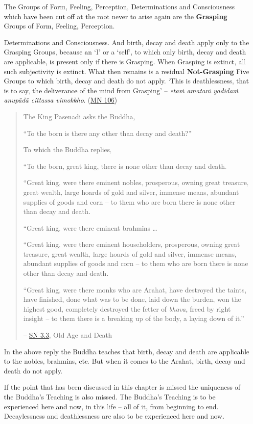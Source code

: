 The Groups of Form, Feeling, Perception, Determinations and Consciousness which have been cut off at the root never to arise again are the \textbf{Grasping} Groups of Form, Feeling, Perception.

Determinations and Consciousness. And birth, decay and death apply only to the Grasping Groups, because an `I' or a `self', to which only birth, decay and death are applicable, is present only if there is Grasping. When Grasping is extinct, all such subjectivity is extinct. What then remains is a residual \textbf{Not-Grasping} Five Groups to which birth, decay and death do not apply. `This is deathlessness, that is to say, the deliverance of the mind from Grasping' -- \emph{etaṁ amataṁ yadidaṁ anupādā cittassa vimokkho}. (\href{https://suttacentral.net/mn106/en/sujato}{MN 106})

\begin{quote}
The King Pasenadi asks the Buddha,

``To the born is there any other than decay and death?''

To which the Buddha replies,

``To the born, great king, there is none other than decay and death.

``Great king, were there eminent nobles, prosperous, owning great treasure, great wealth, large hoards of gold and silver, immense means, abundant supplies of goods and corn -- to them who are born there is none other than decay and death.

``Great king, were there eminent brahmins \ldots\hspace{0pt}

``Great king, were there eminent householders, prosperous, owning great treasure, great wealth, large hoards of gold and silver, immense means, abundant supplies of goods and corn -- to them who are born there is none other than decay and death.

``Great king, were there monks who are Arahat, have destroyed the taints, have finished, done what was to be done, laid down the burden, won the highest good, completely destroyed the fetter of \emph{bhava}, freed by right insight -- to them there is a breaking up of the body, a laying down of it.''

 -- \href{https://suttacentral.net/sn3.3/en/sujato}{SN 3.3}, Old Age and Death
\end{quote}

In the above reply the Buddha teaches that birth, decay and death are applicable to the nobles, brahmins, etc. But when it comes to the Arahat, birth, decay and death do not apply.

If the point that has been discussed in this chapter is missed the uniqueness of the Buddha's Teaching is also missed. The Buddha's Teaching is to be experienced here and now, in this life -- all of it, from beginning to end. Decaylessness and deathlessness are also to be experienced here and now.
